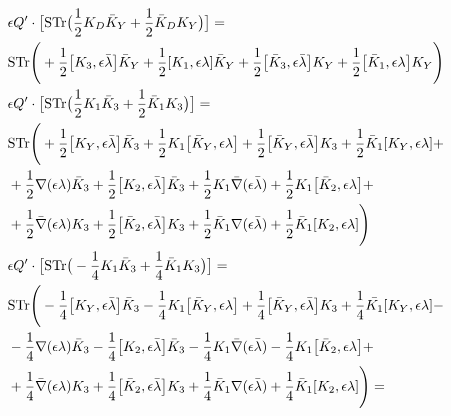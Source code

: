 \documentclass[12pt]{article}
\numberwithin{equation}{section}
\begin{document}
{\allowdisplaybreaks
\begin{align}
	&\epsilon Q' \cdot \big[\text{STr}\big(\frac{1}{2} K_D \bar{K}_Y + \frac{1}{2} \bar{K}_D K_Y\big)\big] =\nonumber \\\nonumber
	&\text{STr}\Biggr(+\frac{1}{2}\comm{K_3}{\epsilon \bar{\lambda}} \bar{K}_Y + \frac{1}{2}\comm{K_1}{\epsilon \lambda} \bar{K}_Y +
\frac{1}{2} \comm{\bar{K}_3}{\epsilon \bar{\lambda}} K_Y + \frac{1}{2}\comm{\bar{K}_1}{\epsilon \lambda} K_Y \Biggr)\\
	&\epsilon Q' \cdot \big[\text{STr}\big(\frac{1}{2} K_1\bar{K}_3 + \frac{1}{2} \bar{K}_1 K_3\big) \big]= \nonumber \\
	&\text{STr}\Biggr(+\frac{1}{2} \comm{K_Y}{\epsilon \bar{\lambda}} \bar{K}_3 + \frac{1}{2} K_1 \comm{\bar{K}_Y}{\epsilon \lambda} + \frac{1}{2} \comm{\bar{K}_Y}{\epsilon \bar{\lambda}} K_3 + \frac{1}{2} \bar{K}_1 \comm{K_Y}{\epsilon \lambda} + \nonumber \\
											  &+\frac{1}{2}\nabla(\epsilon \lambda)\bar{K}_3 + \frac{1}{2}\comm{K_2}{\epsilon \bar{\lambda}} \bar{K}_3 + \frac{1}{2}K_1 \bar{\nabla}(\epsilon \bar{\lambda} )+ \frac{1}{2} K_1 \comm{\bar{K}_2}{\epsilon \lambda}+ \nonumber \\
											  &+\frac{1}{2} \bar{\nabla}(\epsilon \lambda)K_3 + \frac{1}{2}\comm{\bar{K}_2}{\epsilon \bar{\lambda}} K_3 + \frac{1}{2}\bar{K}_1 \nabla(\epsilon \bar{\lambda}) + \frac{1}{2} \bar{K}_1 \comm{K_2}{\epsilon \lambda}\Biggr) \nonumber \\
											  &\epsilon Q'\cdot \big[\text{STr}\big(-\frac{1}{4} K_1 \bar{K}_3 + \frac{1}{4} \bar{K}_1 K_3\big)\big] = \nonumber \\
											  &\text{STr}\Biggr( -\frac{1}{4}\comm{K_Y}{\epsilon \bar{\lambda}} \bar{K}_3 - \frac{1}{4} K_1 \comm{\bar{K}_Y}{\epsilon \lambda} + \frac{1}{4} \comm{\bar{K}_Y}{\epsilon \bar{\lambda}} K_3 + \frac{1}{4} \bar{K_1} \comm{K_Y}{\epsilon \lambda} - \nonumber \\
											  &-\frac{1}{4}\nabla(\epsilon \lambda)\bar{K}_3 -\frac{1}{4}\comm{K_2}{\epsilon \bar{\lambda}} \bar{K}_3 - \frac{1}{4} K_1 \bar{\nabla}(\epsilon \bar{\lambda}) - \frac{1}{4} K_1 \comm{\bar{K}_2}{\epsilon \lambda} + \nonumber \\
											  &+\frac{1}{4} \bar{\nabla}(\epsilon \lambda) K_3 + \frac{1}{4} \comm{\bar{K}_2}{\epsilon \bar{\lambda}} K_3 + \frac{1}{4} \bar{K}_1 \nabla(\epsilon \bar{\lambda}) + \frac{1}{4} \bar{K}_1 \comm{K_2}{\epsilon \lambda}\Biggr) = \nonumber \\

\end{align}}
\end{document}

